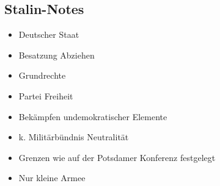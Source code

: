 \documentclass[12pt]{article}
\begin{document}
\subsection*{Stalin-Notes}

\begin{itemize}
	\item Deutscher Staat
	\item Besatzung Abziehen 
	\item Grundrechte
	\item Partei Freiheit
	\item Bekämpfen undemokratischer Elemente
	\item k. Militärbündnis Neutralität
	\item Grenzen wie auf der Potsdamer Konferenz festgelegt
	\item Nur kleine Armee
\end{itemize}
\end{document}
